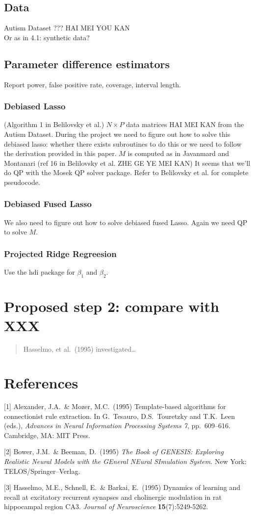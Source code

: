 \documentclass{article}
\begin{document}
\subsection{Data}
Autism Dataset ???
HAI MEI YOU KAN\\
Or as in 4.1: synthetic data?
\subsection{Parameter difference estimators}
Report power, false positive rate, coverage, interval length.
\subsubsection{Debiased Lasso}
(Algorithm 1 in Belilovsky et al.) $N \times P$ data matrices HAI MEI KAN from the Autism Dataset. During the project we need to figure out how to solve this debiased lasso: whether there exists subroutines to do this or we need to follow the derivation provided in this paper. $M$ is computed as in Javanmard and Montanari (ref 16 in Belilovsky et al. ZHE GE YE MEI KAN) It seems that we'll do QP with the Mosek QP solver package.
Refer to Belilovsky et al. for complete pseudocode.
\subsubsection{Debiased Fused Lasso}
We also need to figure out how to solve debiased fused Lasso. Again we need QP to solve $M$.
\subsubsection{Projected Ridge Regreesion}
Use the hdi package for $\beta_1$ and $\beta_2$. 


\section{Proposed step 2: compare with XXX}

\begin{quote}
  Hasselmo, et al.\ (1995) investigated\dots
\end{quote}



\section*{References}

\medskip

\small

[1] Alexander, J.A.\ \& Mozer, M.C.\ (1995) Template-based algorithms
for connectionist rule extraction. In G.\ Tesauro, D.S.\ Touretzky and
T.K.\ Leen (eds.), {\it Advances in Neural Information Processing
  Systems 7}, pp.\ 609--616. Cambridge, MA: MIT Press.

[2] Bower, J.M.\ \& Beeman, D.\ (1995) {\it The Book of GENESIS:
  Exploring Realistic Neural Models with the GEneral NEural SImulation
  System.}  New York: TELOS/Springer--Verlag.

[3] Hasselmo, M.E., Schnell, E.\ \& Barkai, E.\ (1995) Dynamics of
learning and recall at excitatory recurrent synapses and cholinergic
modulation in rat hippocampal region CA3. {\it Journal of
  Neuroscience} {\bf 15}(7):5249-5262.
\end{document}
